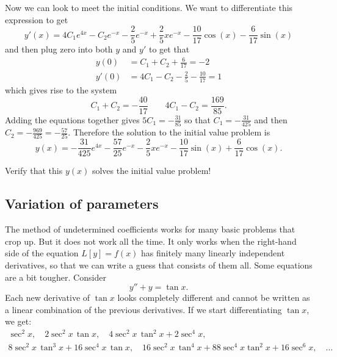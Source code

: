 \begin{exampleSol}
Now we can look to meet the initial conditions. We want to differentiate this expression to get
\begin{equation*}
y'(x) = 4C_1e^{4x} - C_2e^{-x} - \frac{2}{5}e^{-x} + \frac{2}{5}xe^{-x} - \frac{10}{17}\cos(x) - \frac{6}{17}\sin(x)
\end{equation*}
and then plug zero into both $y$ and $y'$ to get that
\begin{equation*}
\begin{split}
y(0) &= C_1 + C_2 + \frac{6}{17} = -2 \\
y'(0) &= 4C_1 - C_2 - \frac{2}{5} - \frac{10}{17} = 1
\end{split}
\end{equation*}
which gives rise to the system
\begin{equation*}
C_1 + C_2 = -\frac{40}{17} \qquad 4C_1 - C_2 = \frac{169}{85}.
\end{equation*}
Adding the equations together gives $5C_1 = - \frac{31}{85}$ so that $C_1 = -\frac{31}{425}$ and then $C_2 = -\frac{969}{425} = -\frac{57}{25}$. Therefore the solution to the initial value problem is
\begin{equation*}
y(x) = -\frac{31}{425}e^{4x} - \frac{57}{25}e^{-x} - \frac{2}{5}xe^{-x} - \frac{10}{17}\sin(x) + \frac{6}{17}\cos(x).
\end{equation*}
\end{exampleSol}

\begin{exercise}
Verify that this $y(x)$ solves the initial value problem!
\end{exercise}

\subsection{Variation of parameters}

The method of undetermined coefficients works for many basic
problems that crop up.  But it does not work all the time.  It only works
when the right-hand side of the equation $L[y] = f(x)$ has finitely many
linearly independent derivatives, so that we can write a guess that consists
of them all.  Some equations are a bit tougher.  Consider
\begin{equation*}
y''+y = \tan x .
\end{equation*}
Each new derivative of $\tan x$ looks completely different and
cannot be written as a linear combination of the previous derivatives.
If we start differentiating $\tan x$, we get:
\begin{multline*}
\sec^2 x, \quad
2\sec^2 x \, \tan x, \quad
4 \sec^2 x \, \tan^2 x + 2 \sec^4 x, \\
8 \sec^2 x \, \tan^3 x + 16 \sec^4 x \, \tan x, \quad
16\sec^2 x \, \tan^4 x + 88 \sec^4 x \tan^2 x + 16 \sec^6 x, \quad
\ldots
\end{multline*}

